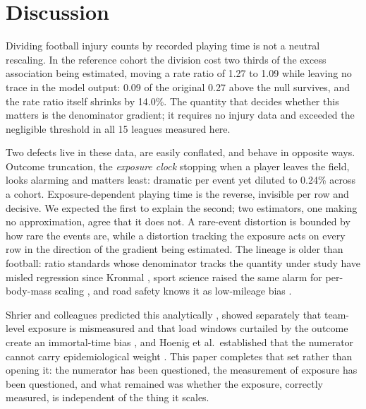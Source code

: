 \documentclass[11pt]{article}
\begin{document}
\section{Discussion}

Dividing football injury counts by recorded playing time is not a neutral rescaling. In the reference cohort the division cost two thirds of the excess association being estimated, moving a rate ratio of 1.27 to 1.09 while leaving no trace in the model output: 0.09 of the original 0.27 above the null survives, and the rate ratio itself shrinks by 14.0\%. The quantity that decides whether this matters is the denominator gradient; it requires no injury data and exceeded the negligible threshold in all 15 leagues measured here.

Two defects live in these data, are easily conflated, and behave in opposite ways. Outcome truncation, the \emph{exposure clock} stopping when a player leaves the field, looks alarming and matters least: dramatic per event yet diluted to 0.24\% across a cohort. Exposure-dependent playing time is the reverse, invisible per row and decisive. We expected the first to explain the second; two estimators, one making no approximation, agree that it does not. A rare-event distortion is bounded by how rare the events are, while a distortion tracking the exposure acts on every row in the direction of the gradient being estimated. The lineage is older than football: ratio standards whose denominator tracks the quantity under study have misled regression since Kronmal \cite{kronmal1993_ratio_standard}, sport science raised the same alarm for per-body-mass scaling \cite{nevill1995_allometric}, and road safety knows it as low-mileage bias \cite{hakamies2002_low_mileage,langford2006_low_mileage}.

Shrier and colleagues predicted this analytically \cite{shrier2022_causal_workload}, showed separately that team-level exposure is mismeasured \cite{stovitz2012_exposure_time} and that load windows curtailed by the outcome create an immortal-time bias \cite{wang2024_immortal_time_load}, and Hoenig et al.\ established that the numerator cannot carry epidemiological weight \cite{hoenig2022citizen_transfermarkt}. This paper completes that set rather than opening it: the numerator has been questioned, the measurement of exposure has been questioned, and what remained was whether the exposure, correctly measured, is independent of the thing it scales.
\end{document}
